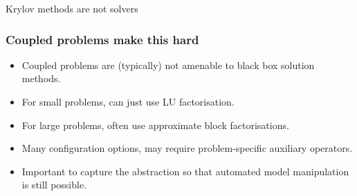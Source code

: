 \documentclass[presentation]{beamer}
\begin{document}
\begin{frame}[standout]
  Krylov methods are not solvers
\end{frame}

\begin{frame}
  \frametitle{Coupled problems make this hard}
  \begin{itemize}
  \item Coupled problems are (typically) not amenable to black box solution
    methods.
  \item For small problems, can just use LU factorisation.
  \item For large problems, often use approximate block factorisations.
  \item Many configuration options, may require problem-specific
    auxiliary operators.
  \item Important to capture the abstraction so that automated model
    manipulation is still possible.
  \end{itemize}
\end{frame}
\end{document}
